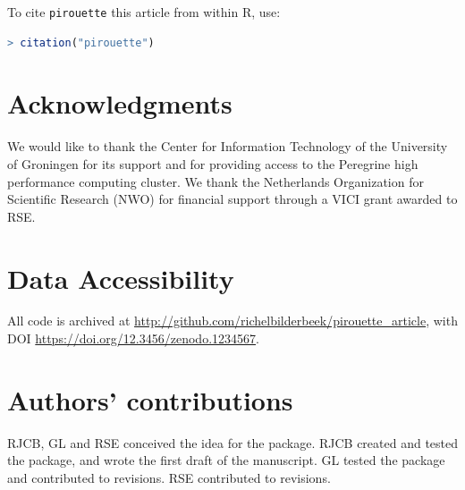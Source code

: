 To cite \verb;pirouette; this article from within R, use:

\begin{lstlisting}[language=R]
> citation("pirouette")
\end{lstlisting}

\section{Acknowledgments}

We would like to thank the Center for Information Technology of the University 
of Groningen for its support and for providing access to the Peregrine 
high performance computing cluster. 
We thank the Netherlands 
Organization for Scientific Research (NWO) for financial support 
through a VICI grant awarded to RSE.

\section{Data Accessibility}

All code is archived at 
\url{http://github.com/richelbilderbeek/pirouette_article},
with DOI \url{https://doi.org/12.3456/zenodo.1234567}.

\section{Authors' contributions}

RJCB, GL and RSE conceived the idea for the package. 
RJCB created and tested the package, and wrote the first draft of the manuscript.
GL tested the package and contributed to revisions.
RSE contributed to revisions.





